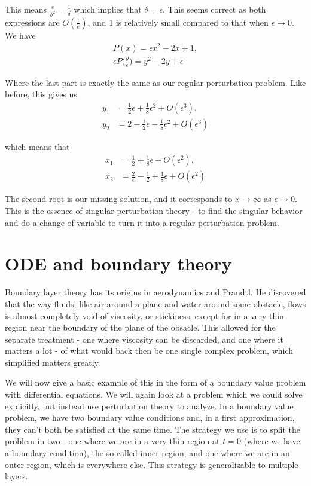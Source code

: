 \documentclass[12pt]{article}
\begin{document}
This means $\frac{\epsilon}{\delta^2} = \frac{1}{\delta}$ which implies that
$\delta = \epsilon$. This seems correct as both expressions are
$O(\frac{1}{e})$, and 1 is relatively small compared to that when $\epsilon \to
0$. We have
\begin{align}
P(x) = \epsilon x^2 - 2x + 1, \\
\epsilon P\Big(\frac{y}{\epsilon}\Big) = y^2 - 2 y + \epsilon
\end{align}

Where the last part is exactly the same as our regular perturbation problem.
Like before, this gives us
\begin{align}
y_1 &= \frac{1}{2} \epsilon + \frac{1}{8} \epsilon^2 + O(\epsilon^3), \\
y_2 &= 2 - \frac{1}{2} \epsilon - \frac{1}{8} \epsilon^2 + O(\epsilon^3)
\end{align}

which means that
\begin{align}
x_1 &= \frac{1}{2} + \frac{1}{8} \epsilon + O(\epsilon^2), \\
x_2 &= \frac{2}{\epsilon} - \frac{1}{2} + \frac{1}{8} \epsilon + O(\epsilon^2)
\end{align}

The second root is our missing solution, and it corresponds to $x \to \infty$ as
$\epsilon \to 0$. This is the essence of singular perturbation theory - to find
the singular behavior and do a change of variable to turn it into a regular
perturbation problem.

\section{ODE and boundary theory}

Boundary layer theory has its origins in aerodynamics and Prandtl. He
discovered that the way fluids, like air around a plane and water
around some obstacle, flows is almost completely void of viscosity, or
stickiness, except for in a very thin region near the boundary of the
plane of the obsacle. This allowed for the separate treatment - one
where viscosity can be discarded, and one where it matters a lot - of
what would back then be one single complex problem, which simplified
matters greatly.

We will now give a basic example of this in the form of a boundary
value problem with differential equations. We will again look at a
problem which we could solve explicitly, but instead use perturbation
theory to analyze. In a boundary value problem, we have two boundary
value conditions and, in a first approximation, they can't both be
satisfied at the same time. The strategy we use is to split the
problem in two - one where we are in a very thin region at $t=0$
(where we have a boundary condition), the so called inner region, and
one where we are in an outer region, which is everywhere else. This
strategy is generalizable to multiple layers.
\end{document}
